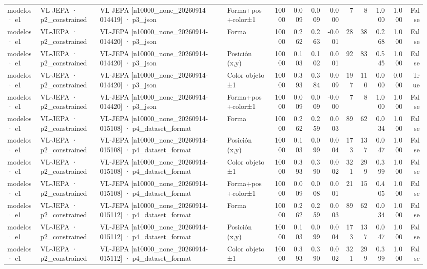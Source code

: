 \begin{tabular}{llllrrrrrrrrr}
modelos · e1 & VL-JEPA · p2\_constrained & VL-JEPA [n10000\_none\_20260914-014419] · p3\_json & Forma+pos+color±1 & 10000 & 0.009 & 0.009 & -0.000 & 7 & 8 & 1.000 & 1.000 & False \\
modelos · e1 & VL-JEPA · p2\_constrained & VL-JEPA [n10000\_none\_20260914-014420] · p3\_json & Forma & 10000 & 0.262 & 0.263 & -0.001 & 28 & 38 & 0.268 & 1.000 & False \\
modelos · e1 & VL-JEPA · p2\_constrained & VL-JEPA [n10000\_none\_20260914-014420] · p3\_json & Posición (x,y) & 10000 & 0.103 & 0.102 & 0.001 & 92 & 83 & 0.545 & 1.000 & False \\
modelos · e1 & VL-JEPA · p2\_constrained & VL-JEPA [n10000\_none\_20260914-014420] · p3\_json & Color objeto ±1 & 10000 & 0.393 & 0.384 & 0.009 & 197 & 110 & 0.000 & 0.000 & True \\
modelos · e1 & VL-JEPA · p2\_constrained & VL-JEPA [n10000\_none\_20260914-014420] · p3\_json & Forma+pos+color±1 & 10000 & 0.009 & 0.009 & -0.000 & 7 & 8 & 1.000 & 1.000 & False \\
modelos · e1 & VL-JEPA · p2\_constrained & VL-JEPA [n10000\_none\_20260914-015108] · p4\_dataset\_format & Forma & 10000 & 0.262 & 0.259 & 0.003 & 89 & 62 & 0.034 & 1.000 & False \\
modelos · e1 & VL-JEPA · p2\_constrained & VL-JEPA [n10000\_none\_20260914-015108] · p4\_dataset\_format & Posición (x,y) & 10000 & 0.103 & 0.099 & 0.004 & 173 & 137 & 0.047 & 1.000 & False \\
modelos · e1 & VL-JEPA · p2\_constrained & VL-JEPA [n10000\_none\_20260914-015108] · p4\_dataset\_format & Color objeto ±1 & 10000 & 0.393 & 0.390 & 0.002 & 321 & 299 & 0.399 & 1.000 & False \\
modelos · e1 & VL-JEPA · p2\_constrained & VL-JEPA [n10000\_none\_20260914-015108] · p4\_dataset\_format & Forma+pos+color±1 & 10000 & 0.009 & 0.008 & 0.001 & 21 & 15 & 0.405 & 1.000 & False \\
modelos · e1 & VL-JEPA · p2\_constrained & VL-JEPA [n10000\_none\_20260914-015112] · p4\_dataset\_format & Forma & 10000 & 0.262 & 0.259 & 0.003 & 89 & 62 & 0.034 & 1.000 & False \\
modelos · e1 & VL-JEPA · p2\_constrained & VL-JEPA [n10000\_none\_20260914-015112] · p4\_dataset\_format & Posición (x,y) & 10000 & 0.103 & 0.099 & 0.004 & 173 & 137 & 0.047 & 1.000 & False \\
modelos · e1 & VL-JEPA · p2\_constrained & VL-JEPA [n10000\_none\_20260914-015112] · p4\_dataset\_format & Color objeto ±1 & 10000 & 0.393 & 0.390 & 0.002 & 321 & 299 & 0.399 & 1.000 & False \\

\end{tabular}
